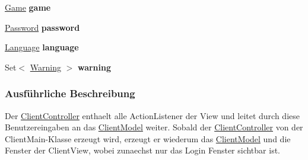 \begin{DoxyCompactItemize}
\item 
\hypertarget{a00001_ac6a5ed6191fcf3a5bf0445921feb4f48}{\hyperlink{a00011}{Game} {\bfseries game}}\label{a00001_ac6a5ed6191fcf3a5bf0445921feb4f48}

\item 
\hypertarget{a00001_a8bd9e497e3595c37b57b29e4234f5cef}{\hyperlink{a00020}{Password} {\bfseries password}}\label{a00001_a8bd9e497e3595c37b57b29e4234f5cef}

\item 
\hypertarget{a00001_a431aadd49e0ba3c9fb62b88ced697cc4}{\hyperlink{a00015}{Language} {\bfseries language}}\label{a00001_a431aadd49e0ba3c9fb62b88ced697cc4}

\item 
\hypertarget{a00001_a9d05c78c4b985e854e3ddbb99059596d}{Set$<$ \hyperlink{a00023}{Warning} $>$ {\bfseries warning}}\label{a00001_a9d05c78c4b985e854e3ddbb99059596d}

\end{DoxyCompactItemize}


\subsubsection{Ausführliche Beschreibung}
Der \hyperlink{a00001}{Client\-Controller} enthaelt alle Action\-Listener der View und leitet durch diese Benutzereingaben an das \hyperlink{a00003}{Client\-Model} weiter. Sobald der \hyperlink{a00001}{Client\-Controller} von der Client\-Main-\/\-Klasse erzeugt wird, erzeugt er wiederum das \hyperlink{a00003}{Client\-Model} und die Fenster der Client\-View, wobei zunaechst nur das Login Fenster sichtbar ist. 